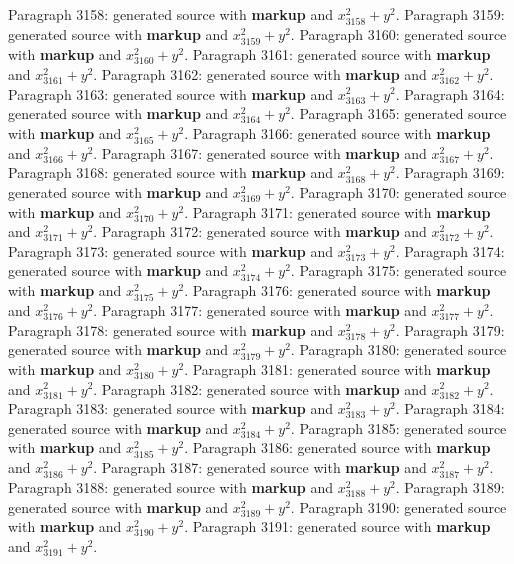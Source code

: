 \documentclass{article}
\begin{document}
Paragraph 3158: generated source with \textbf{markup} and $x_{3158}^2 + y^2$.
Paragraph 3159: generated source with \textbf{markup} and $x_{3159}^2 + y^2$.
Paragraph 3160: generated source with \textbf{markup} and $x_{3160}^2 + y^2$.
Paragraph 3161: generated source with \textbf{markup} and $x_{3161}^2 + y^2$.
Paragraph 3162: generated source with \textbf{markup} and $x_{3162}^2 + y^2$.
Paragraph 3163: generated source with \textbf{markup} and $x_{3163}^2 + y^2$.
Paragraph 3164: generated source with \textbf{markup} and $x_{3164}^2 + y^2$.
Paragraph 3165: generated source with \textbf{markup} and $x_{3165}^2 + y^2$.
Paragraph 3166: generated source with \textbf{markup} and $x_{3166}^2 + y^2$.
Paragraph 3167: generated source with \textbf{markup} and $x_{3167}^2 + y^2$.
Paragraph 3168: generated source with \textbf{markup} and $x_{3168}^2 + y^2$.
Paragraph 3169: generated source with \textbf{markup} and $x_{3169}^2 + y^2$.
Paragraph 3170: generated source with \textbf{markup} and $x_{3170}^2 + y^2$.
Paragraph 3171: generated source with \textbf{markup} and $x_{3171}^2 + y^2$.
Paragraph 3172: generated source with \textbf{markup} and $x_{3172}^2 + y^2$.
Paragraph 3173: generated source with \textbf{markup} and $x_{3173}^2 + y^2$.
Paragraph 3174: generated source with \textbf{markup} and $x_{3174}^2 + y^2$.
Paragraph 3175: generated source with \textbf{markup} and $x_{3175}^2 + y^2$.
Paragraph 3176: generated source with \textbf{markup} and $x_{3176}^2 + y^2$.
Paragraph 3177: generated source with \textbf{markup} and $x_{3177}^2 + y^2$.
Paragraph 3178: generated source with \textbf{markup} and $x_{3178}^2 + y^2$.
Paragraph 3179: generated source with \textbf{markup} and $x_{3179}^2 + y^2$.
Paragraph 3180: generated source with \textbf{markup} and $x_{3180}^2 + y^2$.
Paragraph 3181: generated source with \textbf{markup} and $x_{3181}^2 + y^2$.
Paragraph 3182: generated source with \textbf{markup} and $x_{3182}^2 + y^2$.
Paragraph 3183: generated source with \textbf{markup} and $x_{3183}^2 + y^2$.
Paragraph 3184: generated source with \textbf{markup} and $x_{3184}^2 + y^2$.
Paragraph 3185: generated source with \textbf{markup} and $x_{3185}^2 + y^2$.
Paragraph 3186: generated source with \textbf{markup} and $x_{3186}^2 + y^2$.
Paragraph 3187: generated source with \textbf{markup} and $x_{3187}^2 + y^2$.
Paragraph 3188: generated source with \textbf{markup} and $x_{3188}^2 + y^2$.
Paragraph 3189: generated source with \textbf{markup} and $x_{3189}^2 + y^2$.
Paragraph 3190: generated source with \textbf{markup} and $x_{3190}^2 + y^2$.
Paragraph 3191: generated source with \textbf{markup} and $x_{3191}^2 + y^2$.
\end{document}
